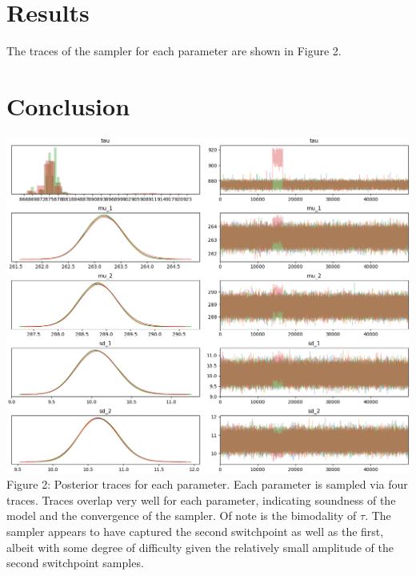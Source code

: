 \documentclass[11pt]{article}
\begin{document}
\begin{multicols*}{2}
\section{Results}
The traces of the sampler for each parameter are shown in Figure 2. 
\section{Conclusion}
    
\end{multicols*}
\begin{center}
    \includegraphics[scale=0.6]{driving-distance-pymc3-posteriors.png}\\
    Figure 2: Posterior traces for each parameter. Each parameter is sampled via four traces. Traces overlap very well for each parameter, indicating soundness of the model and the convergence of the sampler. Of note is the bimodality of $\tau$. The sampler appears to have captured the second switchpoint as well as the first, albeit with some degree of difficulty given the relatively small amplitude of the second switchpoint samples.
\end{center}
\end{document}
